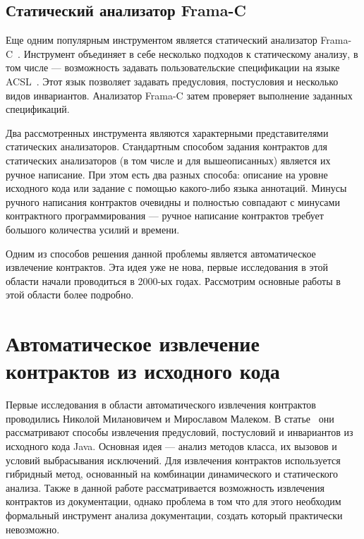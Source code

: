 \subsection{Статический анализатор Frama-C}
Еще одним популярным инструментом является статический анализатор Frama-C~\cite{framaC}. Инструмент объединяет в себе несколько подходов к статическому анализу, в том числе --- возможность задавать пользовательские спецификации на языке ACSL~\cite{acsl}. Этот язык позволяет задавать предусловия, постусловия и несколько видов инвариантов. Анализатор Frama-C затем проверяет выполнение заданных спецификаций.



Два рассмотренных инструмента являются характерными представителями статических анализаторов. Стандартным способом задания контрактов для статических анализаторов (в том числе и для вышеописанных) является их ручное написание. При этом есть два разных способа: описание на уровне исходного кода или задание с помощью какого-либо языка аннотаций. Минусы ручного написания контрактов очевидны и полностью совпадают с минусами контрактного программирования --- ручное написание контрактов требует большого количества усилий и времени.

Одним из способов решения данной проблемы является автоматическое извлечение контрактов. Эта идея уже не нова, первые исследования в этой области начали проводиться в 2000-ых годах. Рассмотрим основные работы в этой области более подробно.

\section{Автоматическое извлечение контрактов из исходного кода}
Первые исследования в области автоматического извлечения контрактов проводились Николой Милановичем и Мирославом Малеком. В статье~\cite{extractingContractsFromJava} они рассматривают способы извлечения предусловий, постусловий и инвариантов из исходного кода Java. Основная идея --- анализ методов класса, их вызовов и условий выбрасывания исключений. Для извлечения контрактов используется гибридный метод, основанный на комбинации динамического и статического анализа. Также в данной работе рассматривается возможность извлечения контрактов из документации, однако проблема в том что для этого необходим формальный инструмент анализа документации, создать который практически невозможно.

